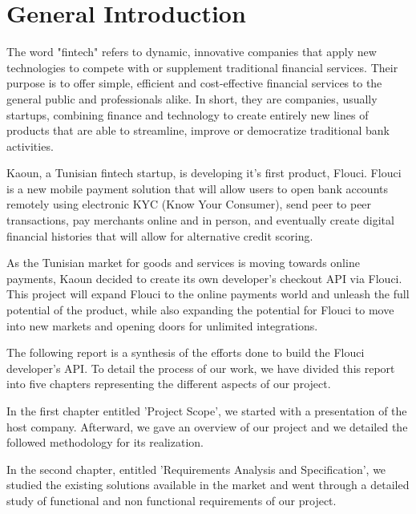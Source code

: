 \chapter*{General Introduction}
\graphicspath{{Introduction/figures/}}
\begin{spacing}{1.1}

The word "fintech" refers to dynamic, innovative companies that apply new technologies to compete with or supplement traditional financial services. Their purpose is to offer simple, efficient and cost-effective financial services to the general public and professionals alike. In short, they are companies, usually startups, combining finance and technology to create entirely new lines of products that are able to streamline, improve or democratize traditional bank activities.\newline

Kaoun, a Tunisian fintech startup, is developing it's first product, Flouci. Flouci is a new mobile payment solution that will allow users to open bank accounts remotely using electronic KYC (Know Your Consumer), send peer to peer transactions, pay merchants online and in person, and eventually create digital financial histories that will allow for alternative credit scoring.   \newline


As the Tunisian market for goods and services is moving towards online payments, Kaoun decided to create its own developer's checkout API via Flouci. This project will expand Flouci to the online payments world and unleash the full potential of the product, while also expanding the potential for Flouci to move into new markets and opening doors for unlimited integrations.\newline


The following report is a synthesis of the efforts done to build the Flouci developer's API.
To detail the process of our work, we have divided this report into five chapters representing the different aspects of our project.

In the first chapter entitled 'Project Scope', we started with a presentation of the host company. Afterward,  we gave an overview of our project and we detailed the followed methodology for its realization.

In the second chapter, entitled 'Requirements Analysis and Specification', we studied the existing solutions available in the market and went through a detailed study of functional and non functional requirements of our project.


\end{spacing}
